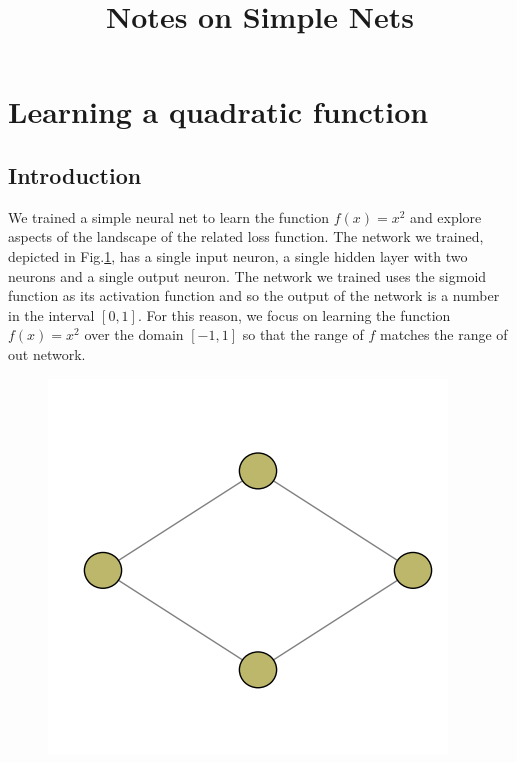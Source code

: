\documentclass[12pt,a4paper]{article}
\begin{document}
\title{ Notes on Simple Nets }

\author[$\dagger$]{}
\date{}

\maketitle


\section{Learning a quadratic function}

\subsection{Introduction}

We trained a simple neural net to learn the function $f(x)=x^2$ and explore aspects of the landscape of the related loss function. The network we trained, depicted in Fig.\ref{DiamondNet}, has a single input neuron, a single hidden layer with two neurons and a single output neuron. The network we trained uses the sigmoid function as its activation function and so the output of the network is a number in the interval $[0,1]$. For this reason, we focus on learning the function $f(x)=x^2$ over the domain $[-1,1]$ so that the range of $f$ matches the range of out network.

\begin{figure}
\center
\includegraphics[scale=0.5]{Images/net_1_2_1.png}
\caption{}
\label{DiamondNet}
\end{figure}
\end{document}
